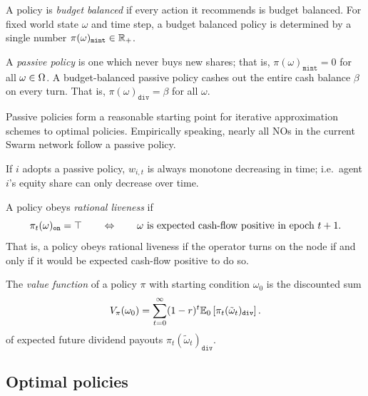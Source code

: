 A policy is \emph{budget balanced} if every action it recommends is budget balanced.
%
For fixed world state $\omega$ and time step, a budget balanced policy is determined by a single number $\pi(\omega)_\mathtt{mint}\in\mathbb{R}_+$.

\begin{definition}

  A \emph{passive policy} is one which never buys new shares; that is, $\pi(\omega)_\mathtt{mint}=0$ for all $\omega\in\Omega$.
  A budget-balanced passive policy cashes out the entire cash balance $\beta$ on every turn. 
  That is, $\pi(\omega)_\mathtt{div}=\beta$ for all $\omega$.

\end{definition}

Passive policies form a reasonable starting point for iterative approximation schemes to optimal policies.
%
Empirically speaking, nearly all NOs in the current Swarm network follow a passive policy.

If $i$ adopts a passive policy, $w_{i,t}$ is always monotone decreasing in time; i.e.~agent $i$'s equity share can only decrease over time.

\begin{definition}
  \label{def:rational-liveness}

  A policy obeys \emph{rational liveness} if 
  \[
    \pi_t(\omega)_{\mathtt{on}} = \top \qquad \Leftrightarrow \qquad \omega\text{ is expected cash-flow positive in epoch }t+1.
  \]
  That is, a policy obeys rational liveness if the operator turns on the node if and only if it would be expected cash-flow positive to do so.

\end{definition}

\begin{definition}
  \label{def:policy-value}

  The \emph{value function} of a policy $\pi$ with starting condition $\omega_0$ is the discounted sum
  \[
    V_\pi(\omega_0) = \sum_{t=0}^\infty (1-r)^t\mathbb{E}_0 \left[ \pi_t(\tilde{\omega}_t)_\mathtt{div} \right].
  \]
  of expected future dividend payouts $\pi_t(\tilde{\omega}_t)_\mathtt{div}$.

\end{definition}


\subsection{Optimal policies}
\label{section:optimal}



